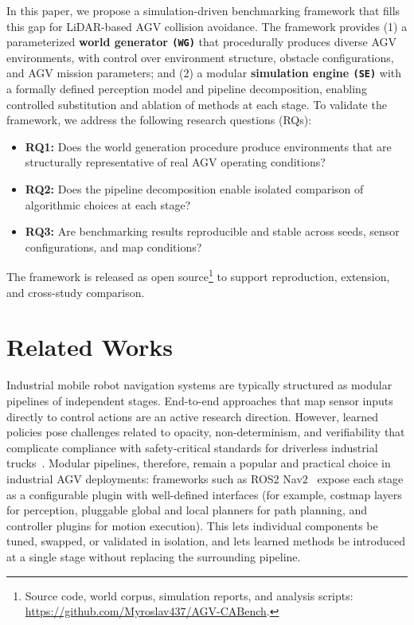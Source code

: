 \documentclass[conference]{IEEEtran}
\begin{document}
In this paper, we propose a simulation-driven benchmarking framework that fills this gap for LiDAR-based AGV collision avoidance. The framework provides (1) a parameterized \textbf{world generator \texttt{(WG)}} that procedurally produces diverse AGV environments, with control over environment structure, obstacle configurations, and AGV mission parameters; and (2) a modular \textbf{simulation engine \texttt{(SE)}} with a formally defined perception model and pipeline decomposition, enabling controlled substitution and ablation of methods at each stage.
To validate the framework, we address the following research questions (RQs):
 
\begin{itemize}
    \item \textbf{RQ1:} Does the world generation procedure produce environments that are structurally representative of real AGV operating conditions?
    \item \textbf{RQ2:} Does the pipeline decomposition enable isolated comparison of algorithmic choices at each stage?
    \item \textbf{RQ3:} Are benchmarking results reproducible and stable across seeds, sensor configurations, and map conditions?
\end{itemize}
 
The framework is released as open source\footnote{Source code, world corpus, simulation reports, and analysis scripts: \mbox{\url{https://github.com/Myroslav437/AGV-CABench}}.} to support reproduction, extension, and cross-study comparison.
 
\section{Related Works}
\label{sec:related-works}
Industrial mobile robot navigation systems are typically structured as modular pipelines of independent stages. End-to-end approaches that map sensor inputs directly to control actions are an active research direction. However, learned policies pose challenges related to opacity, non-determinism, and verifiability that complicate compliance with safety-critical standards for driverless industrial trucks~\cite{iso3691-4, perezcerrolaza2024aisafety}. Modular pipelines, therefore, remain a popular and practical choice in industrial AGV deployments: frameworks such as ROS2 Nav2~\cite{macenski2023ros2nav} expose each stage as a configurable plugin with well-defined interfaces (for example, costmap layers for perception, pluggable global and local planners for path planning, and controller plugins for motion execution). This lets individual components be tuned, swapped, or validated in isolation, and lets learned methods be introduced at a single stage without replacing the surrounding pipeline.
 
\end{document}
